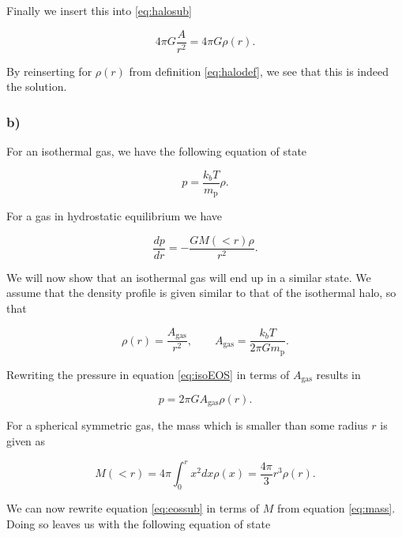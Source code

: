 \documentclass[a4paper]{article}
\begin{document}
\noindent Finally we insert this into \eqref{eq:halosub}

\begin{equation*}
    4\pi G \frac{A}{r^2} = 4\pi G \rho(r).
\end{equation*}

\noindent By reinserting for $\rho(r)$ from definition \eqref{eq:halodef}, we see that this is
indeed the solution.

\subsubsection*{b)}

For an isothermal gas, we have the following equation of state

\begin{equation}\label{eq:isoEOS}
    p = \frac{k_b T}{m_\text{p}} \rho.
\end{equation}

\noindent For a gas in hydrostatic equilibrium we have

\begin{equation}\label{eq:hydrostatic}
    \frac{dp}{dr} = - \frac{GM(<r)\rho}{r^2}.
\end{equation}

\noindent We will now show that an isothermal gas will end up in a similar state. We assume
that the density profile is given similar to that of the isothermal halo, so that 

\begin{equation*}
    \rho (r) = \frac{A_\text{gas}}{r^2}, \qquad  A_\text{gas}  = \frac{k_b T}{2\pi G m_\text{p}}.
\end{equation*}

\noindent Rewriting the pressure in equation \eqref{eq:isoEOS} in terms of $ A_\text{gas} $ results in

\begin{equation}\label{eq:eossub}
    p = 2\pi G  A_\text{gas}  \rho (r).
\end{equation}

\noindent For a spherical symmetric gas, the mass which is smaller than some radius $r$ is
given as

\begin{equation}\label{eq:mass}
    M (<r) = 4\pi \int_0^r x^2 dx \rho(x)  = \frac{4\pi}{3}r^3\rho(r) .
\end{equation}

\noindent We can now rewrite equation \eqref{eq:eossub} in terms of $M $ from equation 
\eqref{eq:mass}. Doing so leaves us with the following equation of state
\end{document}
